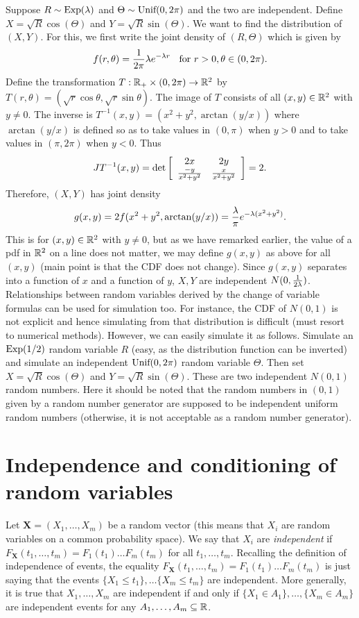 \documentclass[preprint,  11pt]{amsart}
\def\X{\mathbf{X}}
\newcommand{\matrices}[4]{\l[\begin{array}{cc} #1 & #2 \\ #3 & #4  \end{array} \r]}
\begin{document}
\beg Suppose $R\sim \mb{Exp}(\lam)$ and $\Theta\sim \mb{Unif}(0,2\pi)$ and the two are independent. Define $X=\sqrt{R}\cos(\Theta)$ and $Y=\sqrt{R}\sin(\Theta)$. We want to find the distribution of $(X,Y)$. For this, we first write the joint density of $(R,\Theta)$ which is given by
$$
f(r,\theta)=\frac{1}{2\pi}\lam e^{-\lam r} \hsp{2mm}\mb{ for }r>0,\theta\in (0,2\pi).
$$
Define the transformation $T:\R_{+}\times (0,2\pi)\to \R^{2}$ by $T(r,\theta)=(\sqrt{r}\cos\theta,\sqrt{r}\sin \theta)$. The image of $T$ consists of all $(x,y)\in \R^{2}$ with $y\not=0$. The inverse is $T^{-1}(x,y)=(x^{2}+y^{2},\arctan(y/x))$ where $\arctan(y/x)$ is defined so as to take values in $(0,\pi)$ when $y>0$ and to take values in $(\pi,2\pi)$ when $y<0$. Thus
$$
JT^{-1}(x,y) = \det\matrices{2x}{2y}{\frac{-y}{x^{2}+y^{2}}}{\frac{x}{x^{2}+y^{2}}}=2.
$$
Therefore, $(X,Y)$ has joint density
$$
g(x,y) = 2f(x^{2}+y^{2},\arctan(y/x)) = \frac{\lam}{\pi} e^{-\lam(x^{2}+y^{2})}.
$$
This is for $(x,y)\in \R^{2}$ with $y\not=0$, but as we have remarked earlier, the value of a pdf in $\R^{2}$ on a line does not matter, we may define $g(x,y)$ as above for all $(x,y)$ (main point is that the CDF does not change). Since $g(x,y)$ separates into a function of $x$ and a function of $y$, $X,Y$ are independent $N(0,\frac{1}{2\lam})$.
\eeg
\berk Relationships between random variables derived by the change of variable formulas can be used for simulation too. For instance, the CDF of $N(0,1)$ is not explicit and hence simulating from that distribution is difficult (must resort to numerical methods). However, we can easily simulate it as follows. Simulate an $\mb{Exp}(1/2)$ random variable $R$ (easy, as the distribution function can be inverted) and simulate an independent $\mb{Unif}(0,2\pi)$ random variable $\Theta$. Then set $X=\sqrt{R}\cos(\Theta)$ and $Y=\sqrt{R}\sin(\Theta)$. These are two independent $N(0,1)$ random numbers. Here it should be noted that the random numbers in $(0,1)$ given by a random number generator are supposed to be independent uniform random numbers (otherwise, it is not acceptable as a random number generator).
\eerk


\section{Independence and conditioning of random variables}
\bdefn Let $\X=(X_{1},\ldots ,X_{m})$ be a random vector (this means that $X_{i}$ are random variables on a common probability space). We say that $X_{i}$ are {\em independent} if $F_{\X}(t_{1},\ldots ,t_{m})=F_{1}(t_{1})\ldots F_{m}(t_{m})$ for all $t_{1},\ldots ,t_{m}$.
\edefn
\berk Recalling the definition of independence of events, the equality $F_{\X}(t_{1},\ldots ,t_{m})=F_{1}(t_{1})\ldots F_{m}(t_{m})$ is just saying that the events $\{X_{1}\le t_{1}\}, \ldots \{X_{m}\le t_{m}\}$ are independent. More generally, it is true that $X_{1},\ldots ,X_{m}$ are independent if and only if $\{X_{1}\in A_{1}\},\ldots ,\{X_{m}\in A_{m}\}$ are independent events for any $A_{1},\ldots, A_{m}\subseteq \R$.
\eerk
\end{document}
